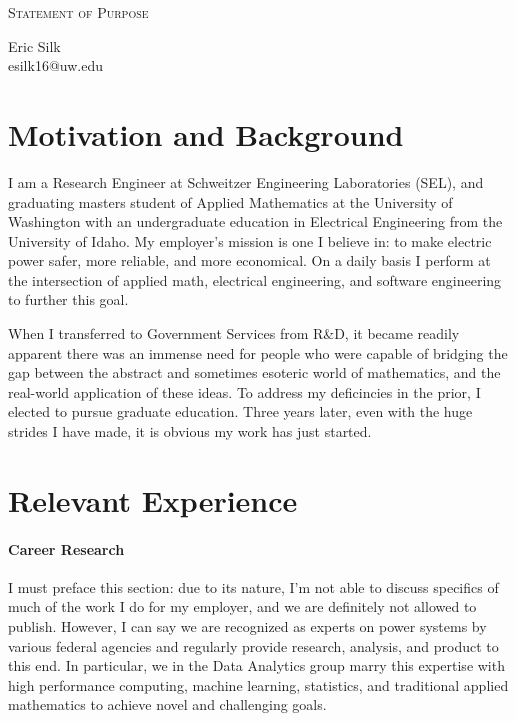 \documentclass[letterpaper]{article}
\makeatletter
\newcommand{\soptitle}{Statement of Purpose}
\newcommand{\yourname}{Eric Silk}
\newcommand{\youremail}{esilk16@uw.edu}
\makeatother
\begin{document}
\begin{center}{\huge \scshape \soptitle}\end{center}
\begin{center}\vspace{0.2em} {\Large \yourname\\}
  {\youremail}\end{center}

\section*{Motivation and Background}
I am a Research Engineer at Schweitzer Engineering Laboratories (SEL), and graduating masters
student of Applied Mathematics at the University of Washington with an undergraduate
education in Electrical Engineering from the University of Idaho. My employer's mission is
one I believe in: to make electric power safer, more reliable, and more economical. On a daily
basis I perform at the intersection of applied math, electrical engineering, and software
engineering to further this goal.

When I transferred to Government Services from R\&D, it became readily apparent there was
an immense need for people who were capable of bridging the gap between the abstract and
sometimes esoteric world of mathematics, and the real-world application of these ideas.
To address my deficincies in the prior, I elected to pursue graduate education. 
Three years later, even with the huge strides I have made, it is obvious my work has
just started.

\section*{Relevant Experience}
\paragraph{Career Research}
I must preface this section: due to its nature, I'm not able to discuss specifics of
much of the work I do for my employer, and we are definitely not allowed to publish.
However, I can say we are recognized as experts
on power systems by various federal agencies and regularly provide research, analysis,
and product to this end. In particular, we in the Data Analytics group marry this expertise
with high performance computing, machine learning, statistics, and traditional applied
mathematics to achieve novel and challenging goals.
\end{document}
